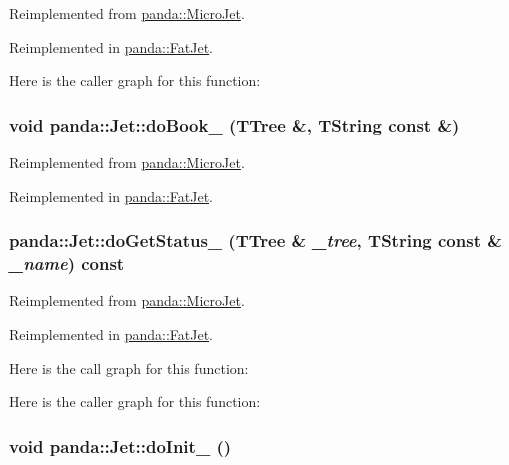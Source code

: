 Reimplemented from \hyperlink{classpanda_1_1MicroJet_a89f2dbacfc1c34c4f34185ea305f8797}{panda::MicroJet}.

Reimplemented in \hyperlink{classpanda_1_1FatJet_a421049d4b4315facb5bda39746f1a38b}{panda::FatJet}.

Here is the caller graph for this function:\hypertarget{classpanda_1_1Jet_a9f7d21237e7933ee156f5edea6a27696}{
\subsubsection[{doBook\_\-}]{\setlength{\rightskip}{0pt plus 5cm}void panda::Jet::doBook\_\- (TTree \&, \/  TString const \&)}}
\label{classpanda_1_1Jet_a9f7d21237e7933ee156f5edea6a27696}


Reimplemented from \hyperlink{classpanda_1_1MicroJet_aa1f5281c41c34033e5ef194f9d846413}{panda::MicroJet}.

Reimplemented in \hyperlink{classpanda_1_1FatJet_a32dbcd6e7cf31c79aed92220c43daed7}{panda::FatJet}.\hypertarget{classpanda_1_1Jet_a4ecbac39b42fe464f6346711aed38aba}{
\subsubsection[{doGetStatus\_\-}]{ panda::Jet::doGetStatus\_\- (TTree \& {\em \_\-tree}, \/  TString const \& {\em \_\-name}) const}}
\label{classpanda_1_1Jet_a4ecbac39b42fe464f6346711aed38aba}


Reimplemented from \hyperlink{classpanda_1_1MicroJet_a2055608524fe0bb8e4fae8ef78e3333e}{panda::MicroJet}.

Reimplemented in \hyperlink{classpanda_1_1FatJet_a96835f1d5e56985c033cc73029dccef0}{panda::FatJet}.

Here is the call graph for this function:

Here is the caller graph for this function:\hypertarget{classpanda_1_1Jet_ac8801b9ee9b645f4d0a24aa34accb414}{
\subsubsection[{doInit\_\-}]{\setlength{\rightskip}{0pt plus 5cm}void panda::Jet::doInit\_\- ()}}
\label{classpanda_1_1Jet_ac8801b9ee9b645f4d0a24aa34accb414}


